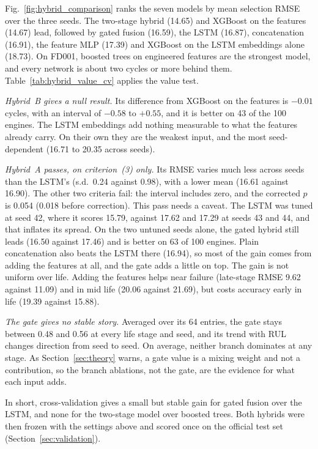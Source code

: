 Fig.~\ref{fig:hybrid_comparison} ranks the seven models by mean selection
RMSE over the three seeds. The two-stage hybrid (14.65) and XGBoost on the
features (14.67) lead, followed by gated fusion (16.59), the LSTM (16.87),
concatenation (16.91), the feature MLP (17.39) and XGBoost on the LSTM
embeddings alone (18.73). On FD001, boosted trees on engineered features are
the strongest model, and every network is about two cycles or more behind
them. Table~\ref{tab:hybrid_value_cv} applies the value test.

\emph{Hybrid~B gives a null result.} Its difference from XGBoost on the
features is $-0.01$ cycles, with an interval of $-0.58$ to $+0.55$, and it is
better on 43 of the 100 engines. The LSTM embeddings add nothing measurable to
what the features already carry. On their own they are the weakest input, and
the most seed-dependent (16.71 to 20.35 across seeds).

\emph{Hybrid~A passes, on criterion~(3) only.} Its RMSE varies much less
across seeds than the LSTM's (s.d.\ 0.24 against 0.98), with a lower mean
(16.61 against 16.90). The other two criteria fail: the interval includes
zero, and the corrected $p$ is 0.054 (0.018 before correction). This pass
needs a caveat. The LSTM was tuned at seed 42, where it scores 15.79, against
17.62 and 17.29 at seeds 43 and 44, and that inflates its spread. On the two
untuned seeds alone, the gated hybrid still leads (16.50 against 17.46) and is
better on 63 of 100 engines. Plain concatenation also beats the LSTM there
(16.94), so most of the gain comes from adding the features at all, and the
gate adds a little on top. The gain is not uniform over life. Adding the
features helps near failure (late-stage RMSE 9.62 against 11.09) and in mid
life (20.06 against 21.69), but costs accuracy early in life (19.39 against
15.88).

\emph{The gate gives no stable story.} Averaged over its 64 entries, the
gate stays between 0.48 and 0.56 at every life stage and seed, and its trend
with RUL changes direction from seed to seed. On average, neither branch dominates at
any stage. As Section~\ref{sec:theory} warns, a gate value is a mixing weight
and not a contribution, so the branch ablations, not the gate, are the
evidence for what each input adds.

In short, cross-validation gives a small but stable gain for gated fusion over
the LSTM, and none for the two-stage model over boosted trees. Both hybrids
were then frozen with the settings above and scored once on the official
test set (Section~\ref{sec:validation}).
